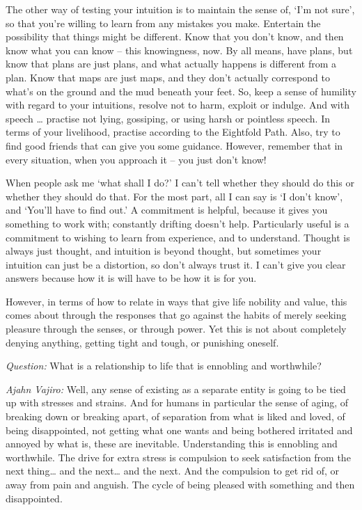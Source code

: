 The other way of testing your intuition is to maintain the sense of, `I'm not
sure', so that you're willing to learn from any mistakes you make. Entertain
the possibility that things might be different. Know that you don't know, and
then know what you can know -- this knowingness, now. By all means, have plans,
but know that plans are just plans, and what actually happens is different from
a plan. Know that maps are just maps, and they don't actually correspond to
what's on the ground and the mud beneath your feet. So, keep a sense of humility
with regard to your intuitions, resolve not to harm, exploit or indulge. And with speech \ldots{} practise not lying, gossiping, or using harsh or pointless
speech. In terms of your livelihood, practise according to the Eightfold Path.
Also, try to find good friends that can give you some guidance. However,
remember that in every situation, when you approach it -- you just don't know!

When people ask me `what shall I do?' I can't tell whether they should do this or whether they
should do that. For the most part, all I can say is `I don't know', and `You'll
have to find out.' A commitment is helpful, because it gives you something to
work with; constantly drifting doesn't help. Particularly useful is a commitment
to wishing to learn from experience, and to understand. Thought is always just
thought, and intuition is beyond thought, but sometimes your intuition can just
be a distortion, so don't always trust it. I can't give you clear answers
because how it is will have to be how it is for you.

However, in terms of how to relate in ways that give life nobility and value,
this comes about through the responses that go against the habits of merely seeking
pleasure through the senses, or through power. Yet this is not about completely
denying anything, getting tight and tough, or punishing oneself.

\bigskip

\emph{Question:} What is a relationship to life that is ennobling and worthwhile?

\emph{Ajahn Vajiro:} Well, any sense of existing as a separate entity is going to be
tied up with stresses and strains. And for humans in particular the sense of aging, of breaking down or breaking apart,
 of separation from what is liked and loved, of being disappointed, not getting what one wants and being bothered irritated and annoyed by what is, these are inevitable. Understanding this is ennobling and worthwhile.
The drive for extra stress is compulsion to seek satisfaction from the next thing… and the next… and the next. And the compulsion to get rid of, or away from pain and anguish. The cycle of being pleased with something and then disappointed. 

